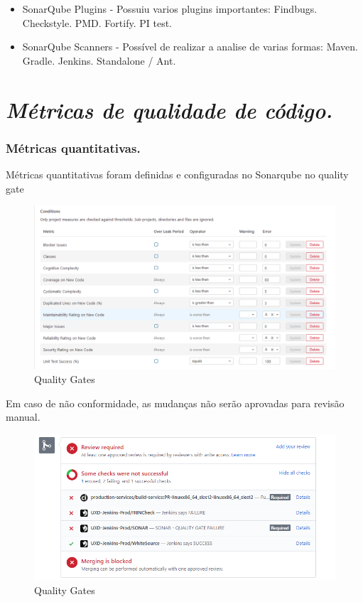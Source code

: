 \documentclass[12pt]{article}
\begin{document}
\begin{itemize}
 \item SonarQube Plugins - Possuiu varios plugins importantes:
  \subitem Findbugs.
	\subitem Checkstyle.
	\subitem PMD.
	\subitem Fortify.
	\subitem PI test.
 \item SonarQube Scanners - Possível de realizar a analise de varias formas:
	\subitem Maven\cite{MAVEN}.
	\subitem Gradle\cite{GRADLE}.
	\subitem Jenkins\cite{JENKINS}.
	\subitem Standalone / Ant\cite{ANT}.
\end{itemize} 

\section{\textit{Métricas de qualidade de código.}} \label{sec:managecodequality}
\subsubsection{Métricas quantitativas.} \label{sec:sonar-planning-mquantity}

Métricas quantitativas foram definidas e configuradas no Sonarqube no quality gate \cite{SONAR_QUALITY_GATE}

\begin{figure}[h]
	\centering
		\includegraphics[scale=0.5]{img/sonar-quality-gates.png}
	\caption{Quality Gates}
	\label{fig:sonar-quality-gates}
\end{figure}


Em caso de não conformidade, as mudanças não serão aprovadas para revisão manual.

\begin{figure}[h]
	\centering
		\includegraphics[scale=0.5]{img/sonar-check-quality-gate-fail.png}
	\caption{Quality Gates}
	\label{fig:sonar-quality-gates}
\end{figure}
\end{document}
